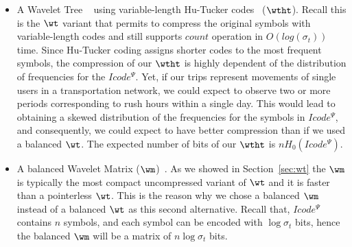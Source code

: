 \begin{itemize}
  \item A Wavelet Tree ~\cite{WT03} using variable-length Hu-Tucker codes~\cite{hu1971optimal} ($\wtht$).
  Recall this is the $\wt$ variant that permits to compress the original symbols with variable-length codes and 
  still supports $count$ operation in $O(log(\sigma_t))$ time. Since Hu-Tucker coding assigns shorter codes
  to the most frequent symbols, the compression of our $\wtht$ is highly dependent of the distribution
  of frequencies for the $Icode^{\Psi}$. Yet, if our 
  trips represent movements of single users in a transportation network, we could expect to observe two or more periods 
  corresponding to rush hours within a single day. This would lead to obtaining a skewed distribution of the frequencies 
  for the symbols in $Icode^{\Psi}$, and consequently, we could expect to have better compression than if we used a 
  balanced $\wt$. The expected number of bits of our $\wtht$ is $nH_0(Icode^{\Psi})$.

  \item A balanced Wavelet Matrix ($\wm$)~\cite{CNO15}. As we showed in Section~\ref{sec:wt} the $\wm$ is typically the most
  compact uncompressed variant of $\wt$ and it is faster than a pointerless $\wt$. This is the reason why we chose
  a balanced $\wm$ instead of a balanced $\wt$ as this second alternative. Recall that, $Icode^{\Psi}$ contains $n$ symbols, 
  and each symbol can be encoded with $\log  \sigma_t$ bits, hence the 
  balanced $\wm$ will be a matrix of $n  \log\sigma_t$ bits.
  
\end{itemize}

